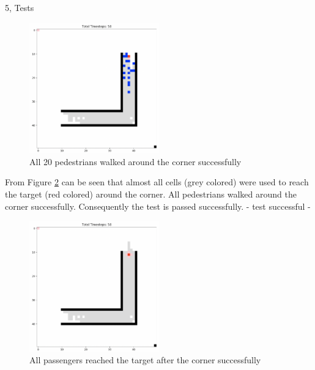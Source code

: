 \documentclass[10pt,a4paper]{article}
\begin{document}
\begin{task}{5, Tests}
\begin{enumerate}
\begin{figure}[H]
    \centering
    \includegraphics[width=0.5\textwidth]{pictures/Test5_meanwhile.png}
    \caption{All 20 pedestrians walked around the corner successfully}
    \label{fig:Test5_2}
\end{figure}
From Figure \ref{fig:Test5_End} can be seen that almost all cells (grey colored) were used to reach the target (red colored) around the corner.
All pedestrians walked around the corner successfully. Consequently the test is passed successfully.
- test successful - 
\begin{figure}
    \centering
    \includegraphics[width=0.5\textwidth]{pictures/Test5_End.png}
    \caption{All passengers reached the target after the corner successfully}
    \label{fig:Test5_End}
\end{figure}
\end{enumerate}
\end{task}
\end{document}
